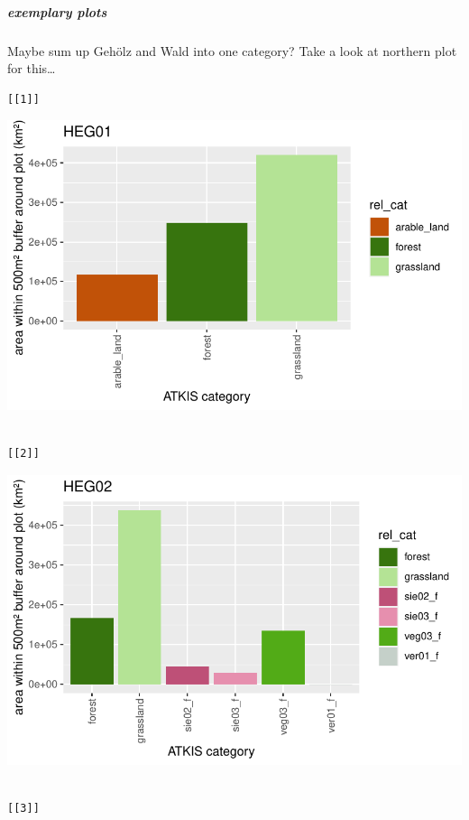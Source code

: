 \documentclass[
  letterpaper,
  DIV=11,
  numbers=noendperiod]{scrartcl}
\let\oldsubparagraph\subparagraph
\renewcommand{\subparagraph}[1]{\oldsubparagraph{#1}\mbox{}}
\begin{document}
\hypertarget{exemplary-plots}{%
\subparagraph{exemplary plots}\label{exemplary-plots}}

Maybe sum up Gehölz and Wald into one category? Take a look at northern
plot for this\ldots{}

\begin{verbatim}
[[1]]
\end{verbatim}

\includegraphics{Landscape_Indices_files/figure-pdf/unnamed-chunk-15-1.pdf}

\begin{verbatim}

[[2]]
\end{verbatim}

\includegraphics{Landscape_Indices_files/figure-pdf/unnamed-chunk-15-2.pdf}

\begin{verbatim}

[[3]]
\end{verbatim}
\end{document}
